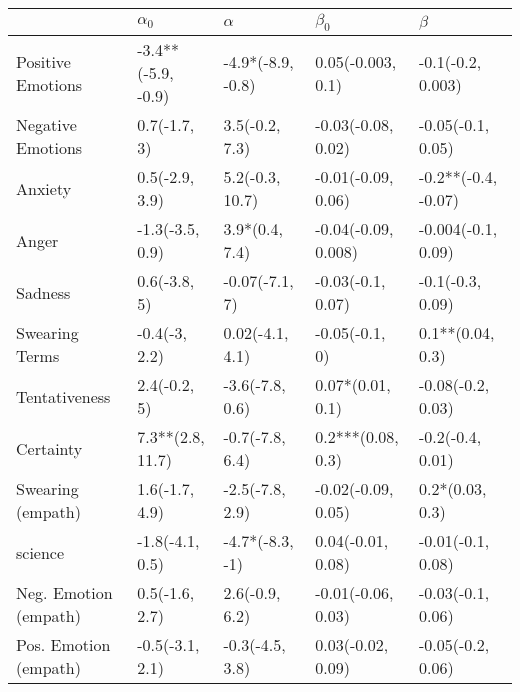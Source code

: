 \begin{tabular}{lllll}
\toprule
{} &          $\alpha_0$ &           $\alpha$ &            $\beta_0$ &              $\beta$ \\
\midrule
Positive Emotions     &  -3.4**(-5.9, -0.9) &  -4.9*(-8.9, -0.8) &    0.05(-0.003, 0.1) &    -0.1(-0.2, 0.003) \\
Negative Emotions     &        0.7(-1.7, 3) &     3.5(-0.2, 7.3) &   -0.03(-0.08, 0.02) &    -0.05(-0.1, 0.05) \\
Anxiety               &      0.5(-2.9, 3.9) &    5.2(-0.3, 10.7) &   -0.01(-0.09, 0.06) &  -0.2**(-0.4, -0.07) \\
Anger                 &     -1.3(-3.5, 0.9) &     3.9*(0.4, 7.4) &  -0.04(-0.09, 0.008) &   -0.004(-0.1, 0.09) \\
Sadness               &        0.6(-3.8, 5) &     -0.07(-7.1, 7) &    -0.03(-0.1, 0.07) &     -0.1(-0.3, 0.09) \\
Swearing Terms        &       -0.4(-3, 2.2) &    0.02(-4.1, 4.1) &       -0.05(-0.1, 0) &     0.1**(0.04, 0.3) \\
Tentativeness         &        2.4(-0.2, 5) &    -3.6(-7.8, 0.6) &     0.07*(0.01, 0.1) &    -0.08(-0.2, 0.03) \\
Certainty             &    7.3**(2.8, 11.7) &    -0.7(-7.8, 6.4) &    0.2***(0.08, 0.3) &     -0.2(-0.4, 0.01) \\
Swearing (empath)     &      1.6(-1.7, 4.9) &    -2.5(-7.8, 2.9) &   -0.02(-0.09, 0.05) &      0.2*(0.03, 0.3) \\
science               &     -1.8(-4.1, 0.5) &    -4.7*(-8.3, -1) &    0.04(-0.01, 0.08) &    -0.01(-0.1, 0.08) \\
Neg. Emotion (empath) &      0.5(-1.6, 2.7) &     2.6(-0.9, 6.2) &   -0.01(-0.06, 0.03) &    -0.03(-0.1, 0.06) \\
Pos. Emotion (empath) &     -0.5(-3.1, 2.1) &    -0.3(-4.5, 3.8) &    0.03(-0.02, 0.09) &    -0.05(-0.2, 0.06) \\
\bottomrule
\end{tabular}
